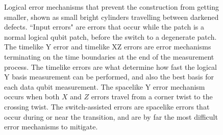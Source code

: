 \documentclass[onecolumn,unpublished,a4paper]{quantumarticle}
\theoremstyle{definition}
\theoremstyle{definition}
\theoremstyle{definition}
\begin{document}
\begin{figure}
    \centering
    \caption{
        Logical error mechanisms that prevent the construction from getting smaller, shown as small bright cylinders travelling between darkened defects.
        ``Input errors" are errors that occur while the patch is a normal logical qubit patch, before the switch to a degenerate patch.
        The timelike Y error and timelike XZ errors are error mechanisms terminating on the time boundaries at the end of the measurement process.
        The timelike errors are what determine how fast the logical Y basis measurement can be performed, and also the best basis for each data qubit measurement.
        The spacelike Y error mechanism occurs when both $X$ and $Z$ errors travel from a corner twist to the crossing twist.
        The switch-assisted errors are spacelike errors that occur during or near the transition, and are by far the most difficult error mechanisms to mitigate.
    }
    \label{fig:logical_error_paths}
\end{figure}
\end{document}

